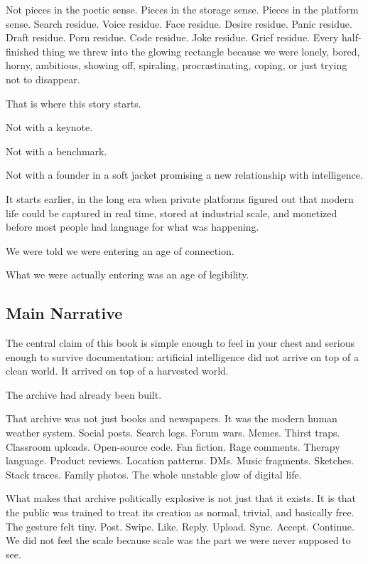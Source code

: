 \documentclass[
  american,
  12pt,
  letterpaper,
]{article}
\begin{document}
Not pieces in the poetic sense. Pieces in the storage sense. Pieces in
the platform sense. Search residue. Voice residue. Face residue. Desire
residue. Panic residue. Draft residue. Porn residue. Code residue. Joke
residue. Grief residue. Every half-finished thing we threw into the
glowing rectangle because we were lonely, bored, horny, ambitious,
showing off, spiraling, procrastinating, coping, or just trying not to
disappear.

That is where this story starts.

Not with a keynote.

Not with a benchmark.

Not with a founder in a soft jacket promising a new relationship with
intelligence.

It starts earlier, in the long era when private platforms figured out
that modern life could be captured in real time, stored at industrial
scale, and monetized before most people had language for what was
happening.

We were told we were entering an age of connection.

What we were actually entering was an age of legibility.

\subsection{Main Narrative}\label{main-narrative}

The central claim of this book is simple enough to feel in your chest
and serious enough to survive documentation: artificial intelligence did
not arrive on top of a clean world. It arrived on top of a harvested
world.

The archive had already been built.

That archive was not just books and newspapers. It was the modern human
weather system. Social posts. Search logs. Forum wars. Memes. Thirst
traps. Classroom uploads. Open-source code. Fan fiction. Rage comments.
Therapy language. Product reviews. Location patterns. DMs. Music
fragments. Sketches. Stack traces. Family photos. The whole unstable
glow of digital life.

What makes that archive politically explosive is not just that it
exists. It is that the public was trained to treat its creation as
normal, trivial, and basically free. The gesture felt tiny. Post. Swipe.
Like. Reply. Upload. Sync. Accept. Continue. We did not feel the scale
because scale was the part we were never supposed to see.
\end{document}

